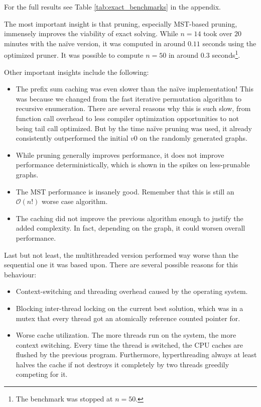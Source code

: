For the full results see Table \ref{tab:exact_benchmarks} in the appendix.

The most important insight is that pruning, especially \acs{MST}-based pruning, immensely improves the viability of exact solving. While $n=14$ took over $20$ minutes with the na\"ive version, it was computed in around $0.11$ seconds using the optimized pruner. It was possible to compute $n=50$ in around $0.3$ seconds\footnote{The benchmark was stopped at $n=50$.}.

Other important insights include the following:
\begin{itemize}
    \item The prefix sum caching was even slower than the na\"ive implementation! This was because we changed from the fast iterative permutation algorithm to recursive enumeration. There are several reasons why this is such slow, from function call overhead to less compiler optimization opportunities to not being tail call optimized. But by the time na\"ive pruning was used, it already consistently outperformed the initial $v0$ on the randomly generated graphs.
    \item While pruning generally improves performance, it does not improve performance deterministically, which is shown in the spikes on less-prunable graphs.
    \item The \ac{MST} performance is insanely good. Remember that this is still an $\mathcal{O}(n!)$ worse case algorithm.
    \item The caching did not improve the previous algorithm enough to justify the added complexity. In fact, depending on the graph, it could worsen overall performance.
\end{itemize}

Last but not least, the multithreaded version performed way worse than the sequential one it was based upon. There are several possible reasons for this behaviour: \label{rayondoof}
\begin{itemize}
    \item Context-switching and threading overhead caused by the operating system.
    \item Blocking inter-thread locking on the current best solution, which was in a mutex that every thread got an atomically reference counted pointer for.
    \item Worse cache utilization. The more threads run on the system, the more context switching. Every time the thread is switched, the CPU caches are flushed by the previous program. Furthermore, hyperthreading always at least halves the cache if not destroys it completely by two threads greedily competing for it.
\end{itemize}

